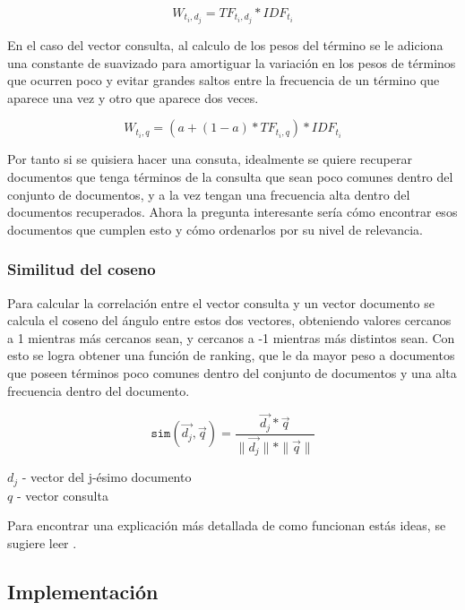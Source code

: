 \documentclass{llncs}
\begin{document}
    \begin{equation}
        W_{t_i, d_j} = TF_{t_i, d_j} * IDF_{t_i}
    \end{equation}

    En el caso del vector consulta, al calculo de los pesos del término se le adiciona una constante de suavizado para amortiguar la variación en los pesos de términos que ocurren poco y evitar grandes saltos entre la frecuencia de un término que aparece una vez y otro que aparece dos veces.

    \begin{equation}
        W_{t_i, q} = (a + (1-a) * TF_{t_i, q}) * IDF_{t_i}
    \end{equation}
        
    Por tanto si se quisiera hacer una consuta, idealmente se quiere recuperar documentos que tenga términos de la consulta que sean poco comunes dentro del conjunto de documentos, y a la vez tengan una frecuencia alta dentro del documentos recuperados. Ahora la pregunta interesante sería cómo encontrar esos documentos que cumplen esto y cómo ordenarlos por su nivel de relevancia.

    \subsubsection{Similitud del coseno} Para calcular la correlación entre el vector consulta y un vector documento se calcula el coseno del ángulo entre estos dos vectores, obteniendo valores cercanos a 1 mientras más cercanos sean, y cercanos a -1 mientras más distintos sean. Con esto se logra obtener una función de ranking, que le da mayor peso a documentos que poseen términos poco comunes dentro del conjunto de documentos y una alta frecuencia dentro del documento. 

    \begin{equation}
        \texttt{sim} (\Vec{d_j}, \Vec{q}) = \frac{\Vec{d_j} * \Vec{q}}{ \| \Vec{d_j} \| * \| \Vec{q} \| }
    \end{equation}

    \begin{center}
        $d_j$ - vector del j-ésimo documento\\
        $q$ - vector consulta
    \end{center}

    Para encontrar una explicación más detallada de como funcionan estás ideas, se sugiere leer \cite[epígrafe 6]{B1}.

    \subsection{Implementación}
\end{document}
